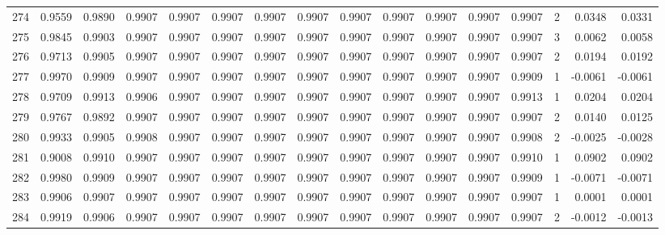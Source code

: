 \begin{tabular}{lrrrrrrrrrrrrrrr}
274 &      0.9559 &  0.9890 &  0.9907 &  0.9907 &  0.9907 &  0.9907 &  0.9907 &  0.9907 &  0.9907 &  0.9907 &   0.9907 &     0.9907 &      2 &                    0.0348 &                     0.0331 \\
275 &      0.9845 &  0.9903 &  0.9907 &  0.9907 &  0.9907 &  0.9907 &  0.9907 &  0.9907 &  0.9907 &  0.9907 &   0.9907 &     0.9907 &      3 &                    0.0062 &                     0.0058 \\
276 &      0.9713 &  0.9905 &  0.9907 &  0.9907 &  0.9907 &  0.9907 &  0.9907 &  0.9907 &  0.9907 &  0.9907 &   0.9907 &     0.9907 &      2 &                    0.0194 &                     0.0192 \\
277 &      0.9970 &  0.9909 &  0.9907 &  0.9907 &  0.9907 &  0.9907 &  0.9907 &  0.9907 &  0.9907 &  0.9907 &   0.9907 &     0.9909 &      1 &                   -0.0061 &                    -0.0061 \\
278 &      0.9709 &  0.9913 &  0.9906 &  0.9907 &  0.9907 &  0.9907 &  0.9907 &  0.9907 &  0.9907 &  0.9907 &   0.9907 &     0.9913 &      1 &                    0.0204 &                     0.0204 \\
279 &      0.9767 &  0.9892 &  0.9907 &  0.9907 &  0.9907 &  0.9907 &  0.9907 &  0.9907 &  0.9907 &  0.9907 &   0.9907 &     0.9907 &      2 &                    0.0140 &                     0.0125 \\
280 &      0.9933 &  0.9905 &  0.9908 &  0.9907 &  0.9907 &  0.9907 &  0.9907 &  0.9907 &  0.9907 &  0.9907 &   0.9907 &     0.9908 &      2 &                   -0.0025 &                    -0.0028 \\
281 &      0.9008 &  0.9910 &  0.9907 &  0.9907 &  0.9907 &  0.9907 &  0.9907 &  0.9907 &  0.9907 &  0.9907 &   0.9907 &     0.9910 &      1 &                    0.0902 &                     0.0902 \\
282 &      0.9980 &  0.9909 &  0.9907 &  0.9907 &  0.9907 &  0.9907 &  0.9907 &  0.9907 &  0.9907 &  0.9907 &   0.9907 &     0.9909 &      1 &                   -0.0071 &                    -0.0071 \\
283 &      0.9906 &  0.9907 &  0.9907 &  0.9907 &  0.9907 &  0.9907 &  0.9907 &  0.9907 &  0.9907 &  0.9907 &   0.9907 &     0.9907 &      1 &                    0.0001 &                     0.0001 \\
284 &      0.9919 &  0.9906 &  0.9907 &  0.9907 &  0.9907 &  0.9907 &  0.9907 &  0.9907 &  0.9907 &  0.9907 &   0.9907 &     0.9907 &      2 &                   -0.0012 &                    -0.0013 \\

\end{tabular}
